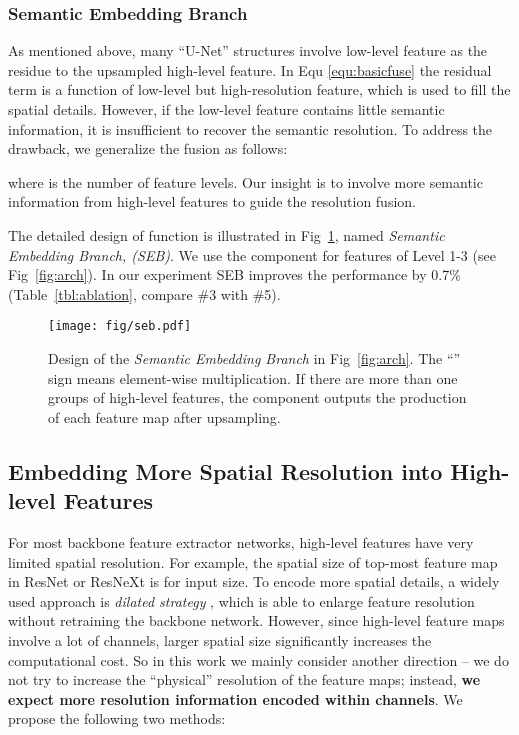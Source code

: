 \documentclass[runningheads]{llncs}
\begin{document}
\subsubsection{Semantic Embedding Branch}

As mentioned above, many ``U-Net'' structures involve low-level feature as the residue to the upsampled high-level feature. In Equ \ref{equ:basicfuse} the residual term  is a function of low-level but high-resolution feature, which is used to fill the spatial details. However, if the low-level feature contains little semantic information, it is insufficient to recover the semantic resolution. To address the drawback, we generalize the fusion as follows:

where  is the number of feature levels. Our insight is to involve more semantic information from high-level features to guide the resolution fusion. 

The detailed design of function  is illustrated in Fig~\ref{fig:semanticembeddingbranch}, named \emph{Semantic Embedding Branch, (SEB)}. We use the component for features of Level 1-3 (see Fig~\ref{fig:arch}). In our experiment SEB improves the performance by 0.7\% (Table~\ref{tbl:ablation}, compare \#3 with \#5).

\begin{figure}
	\centering
	\texttt{[image: fig/seb.pdf]}
	\caption{Design of the \emph{Semantic Embedding Branch} in Fig~\ref{fig:arch}. The ``'' sign means element-wise multiplication. If there are more than one groups of high-level features, the component outputs the production of each feature map after upsampling. }
	\label{fig:semanticembeddingbranch}
\end{figure}


\subsection{Embedding More Spatial Resolution into High-level Features}
\label{sec:tohighlevel}

For most backbone feature extractor networks, high-level features have very limited spatial resolution. For example, the spatial size of top-most feature map in ResNet or ResNeXt is  for  input size. To encode more spatial details, a widely used approach is \emph{dilated strategy} \cite{Yu2015Multi,Chen2016DeepLab,Chen2017Rethinking,Wang2017Understanding,Zhao2016Pyramid,Chen2014Semantic}, which is able to enlarge feature resolution without retraining the backbone network. However, since high-level feature maps involve a lot of channels, larger spatial size significantly increases the computational cost. So in this work we mainly consider another direction -- we do not try to increase the ``physical'' resolution of the feature maps; instead, \textbf{we expect more resolution information encoded within channels}. We propose the following two methods:
\end{document}
